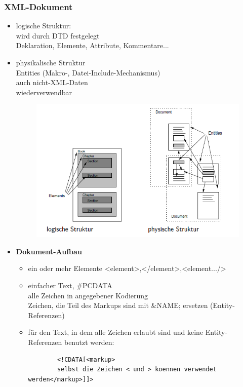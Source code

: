 \subsubsection{XML-Dokument}
\begin{itemize}
	\item logische Struktur:\\
	wird durch DTD festgelegt\\
	Deklaration, Elemente, Attribute, Kommentare...
	\item physikalische Struktur\\
	Entities (Makro-, Datei-Include-Mechanismus)\\
	auch nicht-XML-Daten\\
	wiederverwendbar
	
	\begin{figure}[!h]
		\centering
		\includegraphics[scale=0.7]{img/xml_structure.png}
	\end{figure}
	
	\item \textbf{Dokument-Aufbau}
	\begin{itemize}
		\item ein oder mehr Elemente <element>,</element>,<element.../>
		\item einfacher Text, \#PCDATA\\
		alle Zeichen in angegebener Kodierung\\
		Zeichen, die Teil des Markups sind mit \&NAME; ersetzen (Entity-Referenzen)
		
		\item für den Text, in dem alle Zeichen erlaubt sind und keine Entity-Referenzen benutzt werden:
		\begin{lstlisting}
		<!CDATA[<markup>
		selbst die Zeichen < und > koennen verwendet werden</markup>]]>
		\end{lstlisting}
		

\end{itemize}
\end{itemize}
